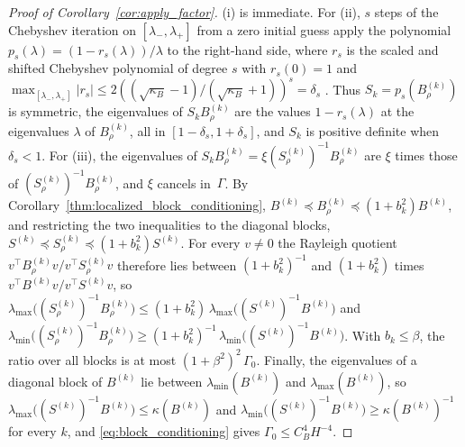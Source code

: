 \documentclass[hidelinks]{siamart}
\theoremstyle{nonumberplain}
\numberwithin{theorem}{section}
\begin{document}
\begin{proof}[Proof of Corollary~\textup{\ref{cor:apply_factor}}]
(i) is immediate.  For (ii), $s$ steps of the Chebyshev iteration on
$[\lambda_-, \lambda_+]$ from a zero initial guess apply the polynomial
$p_s(\lambda) = (1 - r_s(\lambda))/\lambda$ to the right-hand side, where
$r_s$ is the scaled and shifted Chebyshev polynomial of degree $s$ with
$r_s(0) = 1$ and
$\max_{[\lambda_-, \lambda_+]} |r_s| \leq 2((\sqrt{\kappa_B}-1)/(\sqrt{\kappa_B}+1))^s
 = \delta_s$ \cite[\S12.3]{saad2003iterative}.  Thus
$S_k = p_s(B^{(k)}_\rho)$ is symmetric, the eigenvalues of
$S_k B^{(k)}_\rho$ are the values $1 - r_s(\lambda)$ at the eigenvalues
$\lambda$ of $B^{(k)}_\rho$, all in $[1 - \delta_s, 1 + \delta_s]$, and
$S_k$ is positive definite when $\delta_s < 1$.  For (iii), the eigenvalues of
$S_k B^{(k)}_\rho = \xi (S^{(k)}_\rho)^{-1} B^{(k)}_\rho$ are $\xi$ times
those of $(S^{(k)}_\rho)^{-1} B^{(k)}_\rho$, and $\xi$ cancels
in~$\Gamma$.  By Corollary~\ref{thm:localized_block_conditioning},
$B^{(k)} \preceq B^{(k)}_\rho \preceq (1 + b_k^2) B^{(k)}$, and
restricting the two inequalities to the diagonal blocks,
$S^{(k)} \preceq S^{(k)}_\rho \preceq (1 + b_k^2) S^{(k)}$.  For every
$v \neq 0$ the Rayleigh quotient $v^\top B^{(k)}_\rho v / v^\top S^{(k)}_\rho v$
therefore lies between $(1+b_k^2)^{-1}$ and $(1+b_k^2)$ times
$v^\top B^{(k)} v / v^\top S^{(k)} v$, so
$\lambda_{\max}\bigl((S^{(k)}_\rho)^{-1} B^{(k)}_\rho\bigr)
 \leq (1+b_k^2)\, \lambda_{\max}\bigl((S^{(k)})^{-1} B^{(k)}\bigr)$ and
$\lambda_{\min}\bigl((S^{(k)}_\rho)^{-1} B^{(k)}_\rho\bigr)
 \geq (1+b_k^2)^{-1}\, \lambda_{\min}\bigl((S^{(k)})^{-1} B^{(k)}\bigr)$.
With $b_k \leq \beta$, the ratio over all blocks is at most
$(1+\beta^2)^2\, \Gamma_0$.  Finally, the eigenvalues of a diagonal
block of $B^{(k)}$ lie between $\lambda_{\min}(B^{(k)})$ and
$\lambda_{\max}(B^{(k)})$, so
$\lambda_{\max}\bigl((S^{(k)})^{-1} B^{(k)}\bigr) \leq \kappa(B^{(k)})$
and $\lambda_{\min}\bigl((S^{(k)})^{-1} B^{(k)}\bigr) \geq \kappa(B^{(k)})^{-1}$
for every $k$, and \eqref{eq:block_conditioning} gives
$\Gamma_0 \leq C_B^4 H^{-4}$.
\end{proof}
\end{document}
